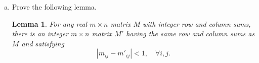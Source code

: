 \documentclass[11pt,letterpaper]{report}
\theoremstyle{plain}
\newtheorem{lemma}[theorem]{Lemma}
\begin{document}
\begin{enumerate}[(a)]
    \item Prove the following lemma.
    \begin{lemma}
        For any real $m\times n$ matrix $M$ with integer row and column sums, there is an integer $m\times n$ matrix $M'$ having the same row and column sums as $M$ and satisfying
        \[
            |m_{ij}-m'_{ij}|<1,\quad \forall i,j.
        \]
    \end{lemma}
\end{enumerate}
\end{document}
